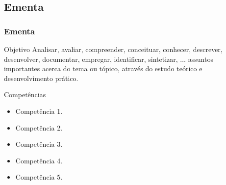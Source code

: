\subsection[Ementa]{Ementa}\label{subsec:plano-ensino-ementa}



\begin{frame}[t]\frametitle{Ementa}

    \begin{block}{Objetivo}
      \justifying{}
      Analisar, avaliar, compreender, conceituar, conhecer, descrever, desenvolver, documentar, empregar, identificar, sintetizar, $\ldots$
      assuntos importantes acerca do tema ou tópico, através do estudo teórico e desenvolvimento prático.
    \end{block}

    \begin{block}{Competências}
      \justifying{}
      \begin{itemize}
        \justifying{}
        \item Competência 1.
        \item Competência 2.
        \item Competência 3.
        \item Competência 4.
        \item Competência 5.
      \end{itemize}
    \end{block}

\end{frame}



